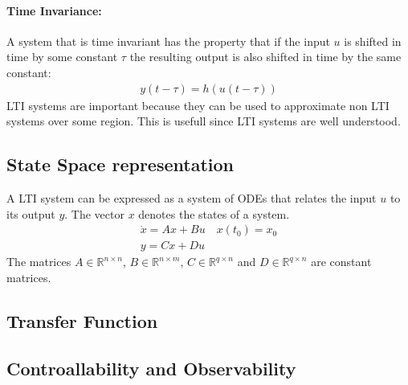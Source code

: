 \paragraph{Time Invariance:}
A system that is time invariant has the property that if the input \(u\) is shifted in time by some constant \(\tau\) the resulting output is also shifted in time by the same constant:
\begin{gather}
y(t - \tau) = h(u(t-\tau))
\end{gather}
LTI systems are important because they can be used to approximate non LTI systems over some region.
This is usefull since LTI systems are well understood.
\cite{DouglasB}
\subsection{State Space representation}
A LTI system can be expressed as a system of ODEs that relates the input \(u\) to its output \(y\).
The vector \(x\) denotes the states of a system.
\begin{gather}
\dot{x} = Ax + Bu \quad x(t_0) = x_0\\
y = Cx + Du
\end{gather}
The matrices \(A \in \mathbb{R}^{n \times n}\),
\(B \in \mathbb{R}^{n \times m}\),
\(C \in \mathbb{R}^{q \times n}\) and
\(D \in \mathbb{R}^{q \times n}\) are constant matrices.
\cite{BennerGrivet}

\subsection{Transfer Function}
\subsection{Controallability and Observability}

